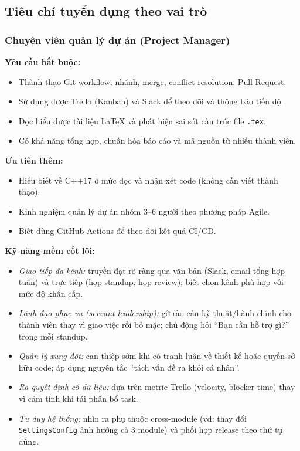 \documentclass[12pt,a4paper]{article}
\begin{document}
\subsection{Tiêu chí tuyển dụng theo vai trò}

\subsubsection{Chuyên viên quản lý dự án (Project Manager)}

\noindent\textbf{Yêu cầu bắt buộc:}
\begin{itemize}[nosep]
    \item Thành thạo Git workflow: nhánh, merge, conflict resolution, Pull Request.
    \item Sử dụng được Trello (Kanban) và Slack để theo dõi và thông báo tiến độ.
    \item Đọc hiểu được tài liệu LaTeX và phát hiện sai sót cấu trúc file \texttt{.tex}.
    \item Có khả năng tổng hợp, chuẩn hóa báo cáo và mã nguồn từ nhiều thành viên.
\end{itemize}

\noindent\textbf{Ưu tiên thêm:}
\begin{itemize}[nosep]
    \item Hiểu biết về C++17 ở mức đọc và nhận xét code (không cần viết thành thạo).
    \item Kinh nghiệm quản lý dự án nhóm 3--6 người theo phương pháp Agile.
    \item Biết dùng GitHub Actions để theo dõi kết quả CI/CD.
\end{itemize}

\noindent\textbf{Kỹ năng mềm cốt lõi:}
\begin{itemize}[nosep]
    \item \textit{Giao tiếp đa kênh:} truyền đạt rõ ràng qua văn bản (Slack, email tổng hợp tuần) và trực tiếp (họp standup, họp review); biết chọn kênh phù hợp với mức độ khẩn cấp.
    \item \textit{Lãnh đạo phục vụ (servant leadership):} gỡ rào cản kỹ thuật/hành chính cho thành viên thay vì giao việc rồi bỏ mặc; chủ động hỏi ``Bạn cần hỗ trợ gì?'' trong mỗi standup.
    \item \textit{Quản lý xung đột:} can thiệp sớm khi có tranh luận về thiết kế hoặc quyền sở hữu code; áp dụng nguyên tắc ``tách vấn đề ra khỏi cá nhân''.
    \item \textit{Ra quyết định có dữ liệu:} dựa trên metric Trello (velocity, blocker time) thay vì cảm tính khi tái phân bổ task.
    \item \textit{Tư duy hệ thống:} nhìn ra phụ thuộc cross-module (vd: thay đổi \texttt{SettingsConfig} ảnh hưởng cả 3 module) và phối hợp release theo thứ tự đúng.
\end{itemize}
\end{document}

